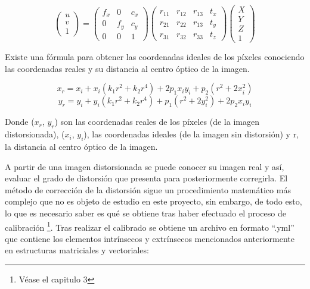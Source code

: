 \begin{equation}
\begin{pmatrix}
u \\
v \\
1 
\end{pmatrix}
=
\begin{pmatrix}
f_x & 0 & c_x\\
0 & f_y & c_y\\
0 & 0 & 1 
\end{pmatrix}
\begin{pmatrix}
r_{11} & r_{12} & r_{13} & t_{x}\\
r_{21} & r_{22} & r_{13} & t_{y}\\
r_{31} & r_{32} & r_{33} & t_{z}
\end{pmatrix}
\begin{pmatrix}
X \\
Y \\
Z \\
1
\end{pmatrix}
\label{matriz}
\end{equation}






Existe una fórmula para obtener las coordenadas ideales de los píxeles conociendo las coordenadas reales y su distancia al centro óptico de la imagen.

\begin{equation}
x_r = x_i + x_i(k_1r^2 + k_2r^4) + 2p_1x_iy_i + p_2(r^2 + 2x_i^2) 
\label{xreal}
\end{equation}
\begin{equation}
y_r = y_i + y_i(k_1r^2 + k_2r^4) + p_1(r^2 + 2y_i^2) + 2p_2x_iy_i
\label{yreal}
\end{equation}

Donde ($x_r$, $y_r$) son las coordenadas reales de los píxeles (de la imagen distorsionada), ($x_i$, $y_i$), las coordenadas ideales (de la imagen sin distorsión) y r, la distancia al centro óptico de la imagen.

A partir de una imagen distorsionada se puede conocer su imagen real y así, evaluar el grado de distorsión que presenta para posteriormente corregirla. El método de corrección de la distorsión sigue un procedimiento matemático más complejo que no es objeto de estudio en este proyecto, sin embargo, de todo esto, lo que es necesario saber es qué se obtiene tras haber efectuado el proceso de calibración \footnote{Véase el capitulo 3}. Tras realizar el calibrado se obtiene un archivo en formato ``.yml'' que contiene los elementos intrínsecos y extrínsecos mencionados anteriormente en estructuras matriciales y vectoriales: 

